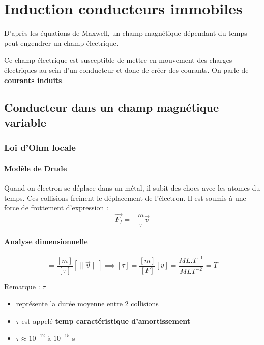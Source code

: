 \chapter{Induction conducteurs immobiles} %
\label{chap:Induction conducteurs immobiles}

D'après les équations de Maxwell, un champ magnétique dépendant du temps peut engendrer un champ électrique. 

Ce champ électrique est susceptible de mettre en mouvement des charges électriques au sein d'un conducteur et donc de créer des courants. On parle de \textbf{courants induits}.

\section{Conducteur dans un champ magnétique variable} %
\label{sec:Conducteur dans un champ magnétique variable}

\subsection{Loi d'Ohm locale} %
\label{sub:Loi d'Ohm locale}

\subsubsection{Modèle de Drude} %
\label{sec:Modèle de Drude}

Quand on électron se déplace dans un métal, il subit des chocs avec les atomes du temps. Ces collisions freinent le déplacement de l'électron. Il est soumis à une \underline{force de frottement} d'expression : 
\begin{equation}
  \overrightarrow{F_f} = - \frac{m}{\tau} \overrightarrow{v}
  \label{eq:frottement}
\end{equation}

\subsubsection{Analyse dimensionnelle} %

\begin{equation}
  [\| \overrightarrow{F_f} \|] = \frac{[m]}{[\tau]} [ \| \overrightarrow{v} \|] \implies [\tau] = \frac{[m]}{[F]} [v] = \frac{ML. T ^{-1}}{MLT ^{-2}}  = T
\end{equation}

Remarque : $\tau$ 
\begin{itemize}

    \item représente la \underline{durée moyenne} entre 2 \underline{collisions} 
    \item $\tau$ est appelé \textbf{temp caractéristique d'amortissement}

    \item $\tau \approx 10 ^{-12}$ à $10 ^{-15}$ s

\end{itemize}

